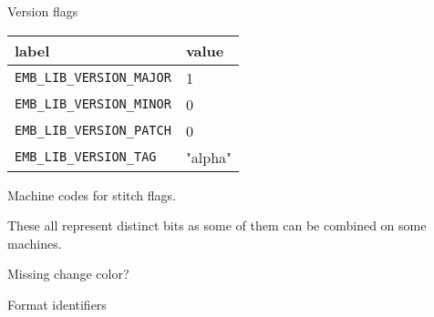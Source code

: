 Version flags

\begin{tabular}{l l}
label & value \\
\hline
\texttt{EMB\_LIB\_VERSION\_MAJOR} & 1 \\
\texttt{EMB\_LIB\_VERSION\_MINOR} & 0 \\
\texttt{EMB\_LIB\_VERSION\_PATCH} & 0 \\
\texttt{EMB\_LIB\_VERSION\_TAG} & "alpha" \\
\end{tabular}

Machine codes for stitch flags.

These all represent distinct bits as some of them can be combined on some
machines.

\begin{center}
\end{center}

Missing change color?

Format identifiers

